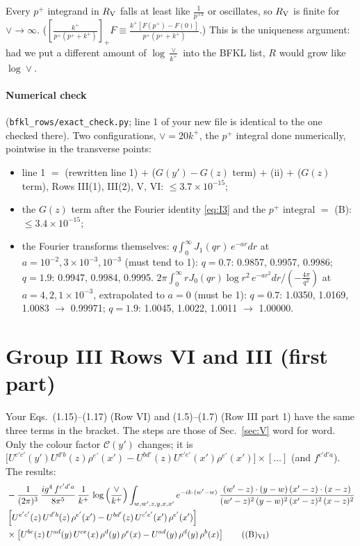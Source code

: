 \documentclass[10pt]{article}
\numberwithin{equation}{section}
\begin{document}
Every $p^+$ integrand in $R_{\rm V}$ falls at least like $\frac{1}{p^{+2}}$ or oscillates, so $R_{\rm V}$ is finite for $\vee\to\infty$. ($\left[\frac{k^+}{p^+(p^++k^+)}\right]_+F\equiv\frac{k^+[F(p^+)-F(0)]}{p^+(p^++k^+)}$.) This is the uniqueness argument: had we put a different amount of $\log\frac{\vee}{k^+}$ into the BFKL list, $R$ would grow like $\log\vee$.

\paragraph{Numerical check} (\texttt{bfkl\_rows/exact\_check.py}; line 1 of your new file is identical to the one checked there). Two configurations, $\vee=20k^+$, the $p^+$ integral done numerically, pointwise in the transverse points:
\begin{itemize}
\item line 1 $=$ (rewritten line 1) $+$ ($G(y')-G(z)$ term) $+$ (ii) $+$ ($G(z)$ term), Rows III(1), III(2), V, VI: $\le3.7\times10^{-15}$;
\item the $G(z)$ term after the Fourier identity \eqref{eq:I3} and the $p^+$ integral $=$ (B): $\le3.4\times10^{-15}$;
\item the Fourier transforms themselves: $q\int_0^\infty J_1(qr)\,e^{-ar}dr$ at $a=10^{-2},3\times10^{-3},10^{-3}$ (must tend to 1): $q=0.7$: 0.9857, 0.9957, 0.9986; $q=1.9$: 0.9947, 0.9984, 0.9995. $2\pi\int_0^\infty rJ_0(qr)\log r^2\,e^{-ar^2}dr\big/(-\frac{4\pi}{q^2})$ at $a=4,2,1\times10^{-3}$, extrapolated to $a=0$ (must be 1): $q=0.7$: 1.0350, 1.0169, 1.0083 $\to$ 0.99971; $q=1.9$: 1.0045, 1.0022, 1.0011 $\to$ 1.00000.
\end{itemize}

\section{Group III Rows VI and III (first part)}
Your Eqs.~(1.15)--(1.17) (Row VI) and (1.5)--(1.7) (Row III part 1) have the same three terms in the bracket. The steps are those of Sec.~\ref{sec:V} word for word. Only the colour factor $\mathcal C(y')$ changes; it is $\big[U^{e'c'}(y')U^{d'b}(z)\rho^{e'}(x')-U^{bd'}(z)U^{c'e'}(x')\rho^{e'}(x')\big]\times[\dots]$ (and $f^{c'd'a}$). The results:
\begin{align}
&-\frac{1}{(2\pi)^{3}}\, \frac{ig^{4}\,f^{c'd'a}}{8\pi^{5}}\, \frac{1}{k^{+}}\,\log{\left(\frac{\vee}{k^{+}}\right)}\int_{w,w',z,y,x,x'} e^{-ik\cdot (w'-w)}\,\frac{(w'-z)\cdot (y-w)\,(x'-z)\cdot (x-z)}{(w'-z)^{2}\,(y-w)^{2}\,(x'-z)^{2}\,(x-z)^{2}}\notag \\
& \left[U^{e'c'}(z)\,U^{d'b}(z)\,\rho^{e'}(x')-U^{bd'}(z)\,U^{c'e'}(x')\,\rho^{e'}(x')\right]\notag \\
& \times\left[U^{bc}(z)\,U^{ad}(y)\,U^{ce}(x)\,\rho^{d}(y)\,\rho^{e}(x)-U^{ad}(y)\,\rho^{d}(y)\,\rho^{b}(x)\right]\tag{(B)$_{\rm VI}$}
\end{align}
\end{document}
